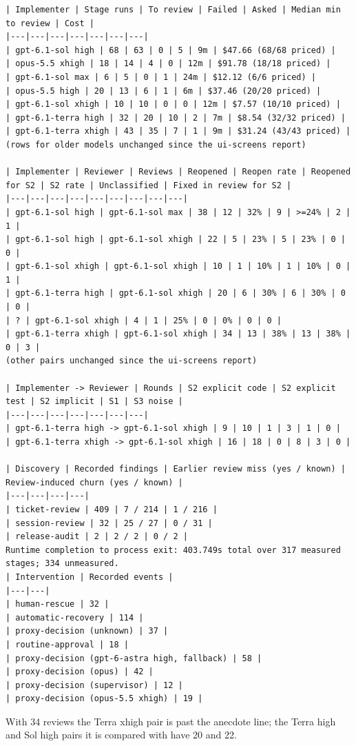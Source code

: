 \documentclass[11pt,a4paper]{article}
\begin{document}
{\tiny
\begin{verbatim}
| Implementer | Stage runs | To review | Failed | Asked | Median min to review | Cost |
|---|---|---|---|---|---|---|
| gpt-6.1-sol high | 68 | 63 | 0 | 5 | 9m | $47.66 (68/68 priced) |
| opus-5.5 xhigh | 18 | 14 | 4 | 0 | 12m | $91.78 (18/18 priced) |
| gpt-6.1-sol max | 6 | 5 | 0 | 1 | 24m | $12.12 (6/6 priced) |
| opus-5.5 high | 20 | 13 | 6 | 1 | 6m | $37.46 (20/20 priced) |
| gpt-6.1-sol xhigh | 10 | 10 | 0 | 0 | 12m | $7.57 (10/10 priced) |
| gpt-6.1-terra high | 32 | 20 | 10 | 2 | 7m | $8.54 (32/32 priced) |
| gpt-6.1-terra xhigh | 43 | 35 | 7 | 1 | 9m | $31.24 (43/43 priced) |
(rows for older models unchanged since the ui-screens report)

| Implementer | Reviewer | Reviews | Reopened | Reopen rate | Reopened for S2 | S2 rate | Unclassified | Fixed in review for S2 |
|---|---|---|---|---|---|---|---|---|
| gpt-6.1-sol high | gpt-6.1-sol max | 38 | 12 | 32% | 9 | >=24% | 2 | 1 |
| gpt-6.1-sol high | gpt-6.1-sol xhigh | 22 | 5 | 23% | 5 | 23% | 0 | 0 |
| gpt-6.1-sol xhigh | gpt-6.1-sol xhigh | 10 | 1 | 10% | 1 | 10% | 0 | 1 |
| gpt-6.1-terra high | gpt-6.1-sol xhigh | 20 | 6 | 30% | 6 | 30% | 0 | 0 |
| ? | gpt-6.1-sol xhigh | 4 | 1 | 25% | 0 | 0% | 0 | 0 |
| gpt-6.1-terra xhigh | gpt-6.1-sol xhigh | 34 | 13 | 38% | 13 | 38% | 0 | 3 |
(other pairs unchanged since the ui-screens report)

| Implementer -> Reviewer | Rounds | S2 explicit code | S2 explicit test | S2 implicit | S1 | S3 noise |
|---|---|---|---|---|---|---|
| gpt-6.1-terra high -> gpt-6.1-sol xhigh | 9 | 10 | 1 | 3 | 1 | 0 |
| gpt-6.1-terra xhigh -> gpt-6.1-sol xhigh | 16 | 18 | 0 | 8 | 3 | 0 |

| Discovery | Recorded findings | Earlier review miss (yes / known) | Review-induced churn (yes / known) |
|---|---|---|---|
| ticket-review | 409 | 7 / 214 | 1 / 216 |
| session-review | 32 | 25 / 27 | 0 / 31 |
| release-audit | 2 | 2 / 2 | 0 / 2 |
Runtime completion to process exit: 403.749s total over 317 measured stages; 334 unmeasured.
| Intervention | Recorded events |
|---|---|
| human-rescue | 32 |
| automatic-recovery | 114 |
| proxy-decision (unknown) | 37 |
| routine-approval | 18 |
| proxy-decision (gpt-6-astra high, fallback) | 58 |
| proxy-decision (opus) | 42 |
| proxy-decision (supervisor) | 12 |
| proxy-decision (opus-5.5 xhigh) | 19 |
\end{verbatim}
}

With 34 reviews the Terra xhigh pair is past the anecdote line; the Terra high and Sol high pairs
it is compared with have 20 and 22.
\end{document}
